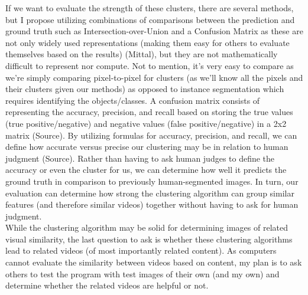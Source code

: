 \documentclass[10pt,twocolumn]{article}
\begin{document}
\indent If we want to evaluate the strength of these clusters, there are several methods, but I propose utilizing combinations of comparisons between the prediction and ground truth such as Intersection-over-Union and a Confusion Matrix as these are not only widely used representations (making them easy for others to evaluate themselves based on the results) (Mittal), but they are not mathematically difficult to represent nor compute. Not to mention, it’s very easy to compare as we’re simply comparing pixel-to-pixel for clusters (as we’ll know all the pixels and their clusters given our methods) as opposed to instance segmentation which requires identifying the objects/classes.
A confusion matrix consists of representing the accuracy, precision, and recall based on storing the true values (true positive/negative) and negative values (false positive/negative) in a 2x2 matrix (Source). By utilizing formulas for accuracy, precision, and recall, we can define how accurate versus precise our clustering may be in relation to human judgment (Source). Rather than having to ask human judges to define the accuracy or even the cluster for us, we can determine how well it predicts the ground truth in comparison to previously human-segmented images. In turn, our evaluation can determine how strong the clustering algorithm can group similar features (and therefore similar videos) together without having to ask for human judgment.
\\
\indent While the clustering algorithm may be solid for determining images of related visual similarity, the last question to ask is whether these clustering algorithms lead to related videos (of most importantly related content). As computers cannot evaluate the similarity between videos based on content, my plan is to ask others to test the program with test images of their own (and my own) and determine whether the related videos are helpful or not.



\printbibliography
\end{document}
